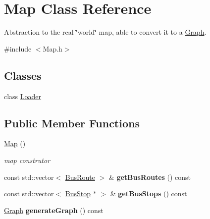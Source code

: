 \hypertarget{class_map}{}\section{Map Class Reference}
\label{class_map}


Abstraction to the real \char`\"{}world\char`\"{} map, able to convert it to a \hyperlink{class_graph}{Graph}.  




{\ttfamily \#include $<$Map.\+h$>$}

\subsection*{Classes}
\begin{DoxyCompactItemize}
\item 
class \hyperlink{class_map_1_1_loader}{Loader}
\end{DoxyCompactItemize}
\subsection*{Public Member Functions}
\begin{DoxyCompactItemize}
\item 
\hypertarget{class_map_a0f5ad0fd4563497b4214038cbca8b582}{}\hyperlink{class_map_a0f5ad0fd4563497b4214038cbca8b582}{Map} ()\label{class_map_a0f5ad0fd4563497b4214038cbca8b582}

\begin{DoxyCompactList}\small\item\em map construtor \end{DoxyCompactList}\item 
\hypertarget{class_map_af125f0e44cfce711a534d679f585398d}{}const std\+::vector$<$ \hyperlink{class_bus_route}{Bus\+Route} $>$ \& {\bfseries get\+Bus\+Routes} () const \label{class_map_af125f0e44cfce711a534d679f585398d}

\item 
\hypertarget{class_map_accd8e5fc6cf0bce023c49573c392e792}{}const std\+::vector$<$ \hyperlink{class_bus_stop}{Bus\+Stop} $\ast$ $>$ \& {\bfseries get\+Bus\+Stops} () const \label{class_map_accd8e5fc6cf0bce023c49573c392e792}

\item 
\hypertarget{class_map_ac235446e8626f7a71e10317549b20cbf}{}\hyperlink{class_graph}{Graph} {\bfseries generate\+Graph} () const \label{class_map_ac235446e8626f7a71e10317549b20cbf}

\end{DoxyCompactItemize}
